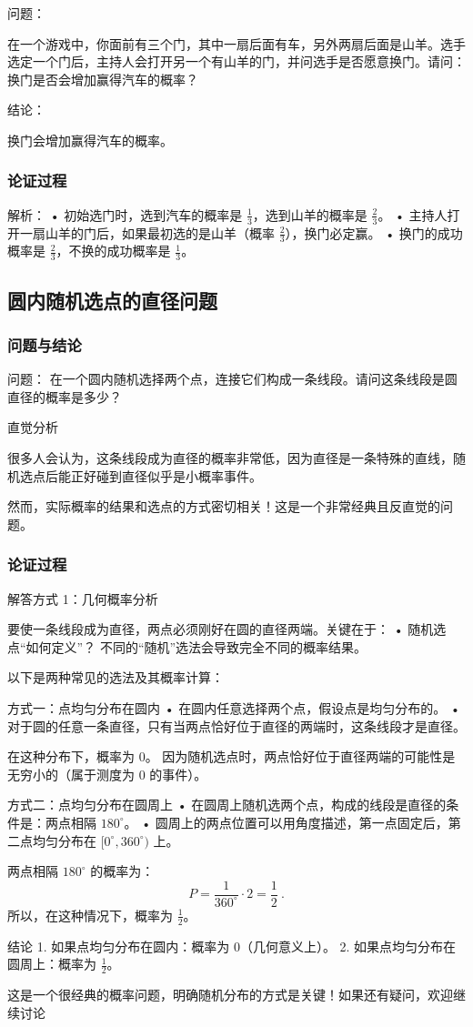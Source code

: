 问题：

在一个游戏中，你面前有三个门，其中一扇后面有车，另外两扇后面是山羊。选手选定一个门后，主持人会打开另一个有山羊的门，并问选手是否愿意换门。请问：换门是否会增加赢得汽车的概率？

结论：

换门会增加赢得汽车的概率。

\subsubsection{论证过程}


解析：
	•	初始选门时，选到汽车的概率是 $\frac{1}{3}$，选到山羊的概率是 $\frac{2}{3}$。
	•	主持人打开一扇山羊的门后，如果最初选的是山羊（概率 $\frac{2}{3}$），换门必定赢。
	•	换门的成功概率是 $\frac{2}{3}$，不换的成功概率是 $\frac{1}{3}$。



\subsection{圆内随机选点的直径问题}

\subsubsection{问题与结论}
问题：
在一个圆内随机选择两个点，连接它们构成一条线段。请问这条线段是圆直径的概率是多少？

直觉分析

很多人会认为，这条线段成为直径的概率非常低，因为直径是一条特殊的直线，随机选点后能正好碰到直径似乎是小概率事件。

然而，实际概率的结果和选点的方式密切相关！这是一个非常经典且反直觉的问题。


\subsubsection{论证过程}
解答方式 1：几何概率分析

要使一条线段成为直径，两点必须刚好在圆的直径两端。关键在于：
	•	随机选点“如何定义”？
不同的“随机”选法会导致完全不同的概率结果。

以下是两种常见的选法及其概率计算：

方式一：点均匀分布在圆内
	•	在圆内任意选择两个点，假设点是均匀分布的。
	•	对于圆的任意一条直径，只有当两点恰好位于直径的两端时，这条线段才是直径。

在这种分布下，概率为 0。
因为随机选点时，两点恰好位于直径两端的可能性是无穷小的（属于测度为 0 的事件）。

方式二：点均匀分布在圆周上
	•	在圆周上随机选两个点，构成的线段是直径的条件是：两点相隔 $180^\circ$。
	•	圆周上的两点位置可以用角度描述，第一点固定后，第二点均匀分布在 $[0^\circ, 360^\circ)$ 上。

两点相隔 $180^\circ$ 的概率为：
$$
P = \frac{1}{360^\circ} \cdot 2 = \frac{1}{2}~.
$$
所以，在这种情况下，概率为 $\frac{1}{2}$。

结论
	1.	如果点均匀分布在圆内：概率为 $0$（几何意义上）。
	2.	如果点均匀分布在圆周上：概率为 $\frac{1}{2}$。

这是一个很经典的概率问题，明确随机分布的方式是关键！如果还有疑问，欢迎继续讨论~
